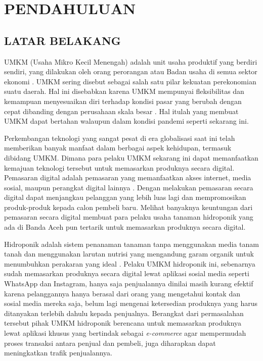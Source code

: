 \fancyhf{} 
\fancyfoot[C]{\thepage}

\chapter{PENDAHULUAN}

\section{\uppercase{LATAR BELAKANG}}
UMKM (Usaha Mikro Kecil Menengah) adalah unit usaha produktif yang berdiri sendiri, yang dilakukan oleh orang perorangan atau Badan usaha di semua sektor ekonomi \citep{tambunan2012peluang}. UMKM sering disebut sebagai salah satu pilar kekuatan perekonomian suatu daerah. Hal ini disebabkan karena UMKM mempunyai fleksibilitas dan kemampuan menyesuaikan diri terhadap kondisi pasar yang berubah dengan cepat dibanding dengan perusahaan skala besar \citep{sartika2002ekonomi}. Hal itulah yang membuat UMKM dapat bertahan walaupun dalam kondisi pandemi seperti sekarang ini.

\par Perkembangan teknologi yang sangat pesat di era globalisasi saat ini telah memberikan banyak manfaat dalam berbagai aspek kehidupan, termasuk dibidang UMKM. Dimana para pelaku UMKM sekarang ini dapat memanfaatkan kemajuan teknologi tersebut untuk memasarkan produknya secara digital. Pemasaran digital adalah pemasaran yang memanfaatkan akses internet, media sosial, maupun perangkat digital lainnya \citep{hardilawati2020strategi}. Dengan melakukan pemasaran secara digital dapat menjangkau pelanggan yang lebih luas lagi dan mempromosikan produk-produk kepada calon pembeli baru. Melihat banyaknya keuntungan dari pemasaran secara digital membuat para pelaku usaha tanaman hidroponik yang ada di Banda Aceh pun tertarik untuk memasarkan produknya secara digital.

\par Hidroponik adalah sistem penanaman tanaman tanpa menggunakan media tanam tanah dan menggunakan larutan nutrisi yang mengandung garam organik untuk menumbuhkan perakaran yang ideal \citep{rosliani2005budidaya}. Pelaku UMKM hidroponik ini, sebenarnya sudah memasarkan produknya secara digital lewat aplikasi sosial media seperti WhatsApp dan Instagram, hanya saja penjualannya dinilai masih kurang efektif karena pelanggannya hanya berasal dari orang yang mengetahui kontak dan sosial media mereka saja, belum lagi mengenai ketersedian produknya yang harus ditanyakan terlebih dahulu kepada penjualnya. Berangkat dari permasalahan tersebut pihak UMKM hidroponik berencana untuk memasarkan produknya lewat aplikasi khusus yang bertindak sebagai \textit{e-commerce} agar mempermudah proses transaksi antara penjual dan pembeli, juga diharapkan dapat meningkatkan trafik penjualannya.

